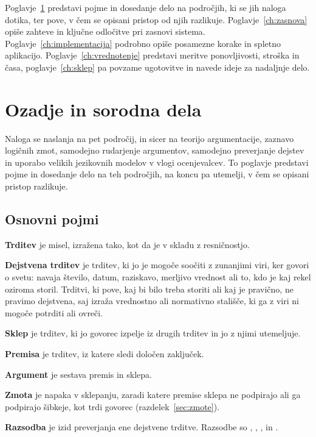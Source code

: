 \documentclass[a4paper, 12pt]{book}
\begin{document}
Poglavje~\ref{ch:ozadje} predstavi pojme in
dosedanje delo na področjih, ki se jih naloga dotika, ter pove, v čem se opisani
pristop od njih razlikuje. Poglavje~\ref{ch:zasnova} opiše zahteve in ključne
odločitve pri zasnovi sistema. Poglavje~\ref{ch:implementacija} podrobno opiše
posamezne korake in spletno aplikacijo. Poglavje~\ref{ch:vrednotenje} predstavi
meritve ponovljivosti, stroška in časa, poglavje~\ref{ch:sklep} pa povzame
ugotovitve in navede ideje za nadaljnje delo.



\chapter{Ozadje in sorodna dela}
\label{ch:ozadje}

Naloga se naslanja na pet področij, in sicer na teorijo argumentacije, zaznavo
logičnih zmot, samodejno rudarjenje argumentov, samodejno preverjanje dejstev in
uporabo velikih jezikovnih modelov v vlogi ocenjevalcev. To poglavje predstavi
pojme in dosedanje delo na teh področjih, na koncu pa utemelji, v čem se opisani
pristop razlikuje.


\section{Osnovni pojmi}
\label{sec:pojmi}

\textbf{Trditev} je misel, izražena tako, kot da je v skladu z resničnostjo. 

\textbf{Dejstvena trditev} je trditev, ki jo je mogoče soočiti z zunanjimi viri,
ker govori o svetu: navaja število, datum, raziskavo, merljivo vrednost ali to, kdo
je kaj rekel oziroma storil. Trditvi, ki pove, kaj bi bilo treba storiti ali kaj je pravično, ne pravimo dejstvena, saj izraža vrednostno ali normativno stališče, ki ga z viri ni mogoče potrditi ali ovreči.

\textbf{Sklep} je trditev, ki jo govorec izpelje iz drugih trditev in jo z njimi utemeljuje.

\textbf{Premisa} je trditev, iz katere sledi določen zaključek.

\textbf{Argument} je sestava premis in sklepa.

\textbf{Zmota} je napaka v sklepanju, zaradi katere premise sklepa ne podpirajo ali ga podpirajo šibkeje, kot trdi govorec (razdelek~\ref{sec:zmote}).

\textbf{Razsodba} je izid preverjanja ene dejstvene trditve. Razsodbe so , , ,  in .
\end{document}
